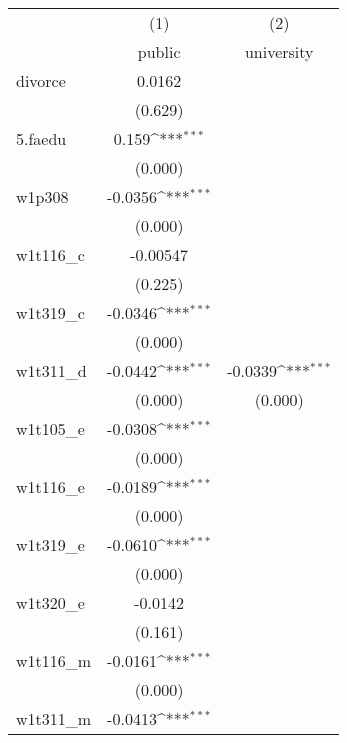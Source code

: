 {
\def\sym#1{\ifmmode^{#1}\else\(^{#1}\)\fi}
\begin{tabular}{l*{2}{c}}
\hline\hline
            &\multicolumn{1}{c}{(1)}&\multicolumn{1}{c}{(2)}\\
            &\multicolumn{1}{c}{public}&\multicolumn{1}{c}{university}\\
\hline
divorce     &      0.0162         &                     \\
            &     (0.629)         &                     \\
[1em]
5.faedu     &       0.159\sym{***}&                     \\
            &     (0.000)         &                     \\
[1em]
w1p308      &     -0.0356\sym{***}&                     \\
            &     (0.000)         &                     \\
[1em]
w1t116\_c    &    -0.00547         &                     \\
            &     (0.225)         &                     \\
[1em]
w1t319\_c    &     -0.0346\sym{***}&                     \\
            &     (0.000)         &                     \\
[1em]
w1t311\_d    &     -0.0442\sym{***}&     -0.0339\sym{***}\\
            &     (0.000)         &     (0.000)         \\
[1em]
w1t105\_e    &     -0.0308\sym{***}&                     \\
            &     (0.000)         &                     \\
[1em]
w1t116\_e    &     -0.0189\sym{***}&                     \\
            &     (0.000)         &                     \\
[1em]
w1t319\_e    &     -0.0610\sym{***}&                     \\
            &     (0.000)         &                     \\
[1em]
w1t320\_e    &     -0.0142         &                     \\
            &     (0.161)         &                     \\
[1em]
w1t116\_m    &     -0.0161\sym{***}&                     \\
            &     (0.000)         &                     \\
[1em]
w1t311\_m    &     -0.0413\sym{***}&                     \\

\end{tabular}}
